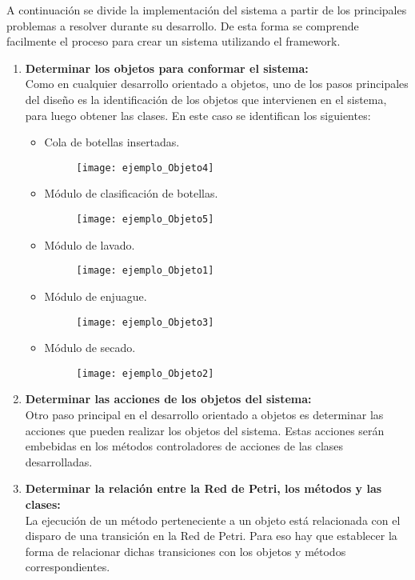 A continuación se divide la implementación del sistema a partir
de los principales problemas a resolver durante su desarrollo. De esta forma se
comprende facilmente el proceso para crear un sistema utilizando el framework.

\begin{enumerate}
\item \textbf{Determinar los objetos para conformar el sistema:}\\
		Como en cualquier desarrollo orientado a objetos, uno de los pasos principales
		del diseño es la identificación de los objetos que intervienen en el sistema,
		para luego obtener las clases.
		En este caso se identifican los siguientes:
			\begin{itemize}
			  \item Cola de botellas insertadas.
				  \begin{figure}[H]
					\centering
					\texttt{[image: ejemplo\_Objeto4]}
				  \end{figure}
			  \item Módulo de clasificación de botellas.
			  	  \begin{figure}[H]
					\centering
					\texttt{[image: ejemplo\_Objeto5]}
				  \end{figure}
			  \item Módulo de lavado.
			      \begin{figure}[H]
					\centering
					\texttt{[image: ejemplo\_Objeto1]}
				  \end{figure}
			  \item Módulo de enjuague.
			        \begin{figure}[H]
						\centering
						\texttt{[image: ejemplo\_Objeto3]}
				    \end{figure}
			  \item Módulo de secado.
			        \begin{figure}[H]
						\centering
						\texttt{[image: ejemplo\_Objeto2]}
				    \end{figure}
			\end{itemize}

\item \textbf{Determinar las acciones de los objetos del sistema:}\\
			Otro paso principal en el desarrollo orientado a objetos es determinar las
			acciones que pueden realizar los objetos del sistema. Estas acciones serán
			embebidas en los métodos controladores de acciones de las clases
			desarrolladas.

\item \textbf{Determinar la relación entre la Red de Petri, los métodos y las clases:}\\
			La ejecución de un método perteneciente a un objeto está relacionada con el
			disparo de una transición en la Red de Petri. Para eso hay que establecer la
			forma de relacionar dichas transiciones con los objetos y métodos
			correspondientes.
			
			
\end{enumerate}
